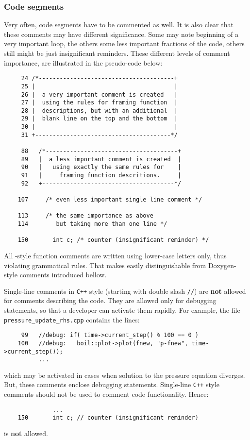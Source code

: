 \subsubsection{Code segments}

Very often, code segments have to be commented as well. It is also clear that
these comments may have different significance. Some may note beginning of a
very important loop, the others some less important fractions of the code, 
others still might be just insignificant reminders. These different levels
of comment importance, are illustrated in the pseudo-code below:
%
{\small \begin{verbatim}
     24 /*---------------------------------------+
     25 |                                        |
     26 |  a very important comment is created   |
     27 |  using the rules for framing function  | 
     28 |  descriptions, but with an additional  |
     29 |  blank line on the top and the bottom  |
     30 |                                        |
     31 +---------------------------------------*/
        
     88   /*--------------------------------------+
     89   |  a less important comment is created  |
     90   |   using exactly the same rules for    |
     91   |     framing function descritions.     |
     92   +--------------------------------------*/
  
    107     /* even less important single line comment */

    113     /* the same importance as above
    114        but taking more than one line */

    150       int c; /* counter (insignificant reminder) */
\end{verbatim}}
 
All {\psiboil}-style function comments are written using lower-case letters only, 
thus violating grammatical rules. That makes easily distinguishable from 
Doxygen-style comments introduced bellow.

Single-line comments in {\tt C++} style (starting with double slash {\tt //}) are
{\bf not} allowed for comments describing the code. They are allowed only for
debugging statements, so that a developer can activate them rapidly. For example,
the file {\tt pressure\_update\_rhs.cpp} contains the lines:
%
{\small \begin{verbatim}
     99   //debug: if( time->current_step() % 100 == 0 ) 
    100   //debug:   boil::plot->plot(fnew, "p-fnew", time->current_step());
          ...
\end{verbatim}}
%
which may be activated in cases when solution to the pressure equation 
diverges. But, these comments enclose debugging statements. Single-line
{\tt C++} style comments should not be used to comment code functionality.
Hence:
%
{\small \begin{verbatim}
              ...
    150       int c; // counter (insignificant reminder)   
\end{verbatim}}
%
is {\bf not} allowed.

